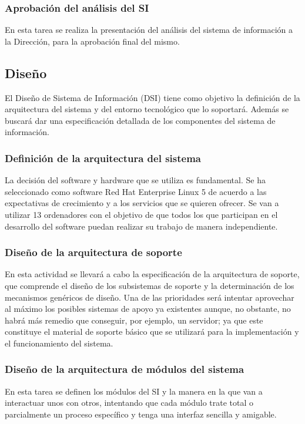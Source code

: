 \documentclass[11pt,a4paper,spanish,twoside]{book}
\begin{document}
\subsubsection{Aprobación del análisis del SI}
En esta tarea se realiza la presentación del análisis del sistema de
información a la Dirección, para la aprobación final del mismo.

\subsection{Diseño}
El Diseño de Sistema de Información (DSI) tiene como objetivo la definición
de la arquitectura del sistema y del entorno tecnológico que lo soportará. 
Además se buscará dar una especificación detallada de los componentes del 
sistema de información.

\subsubsection{Definición de la arquitectura del sistema}
La decisión del software y hardware que se utiliza es fundamental. Se ha
seleccionado como software Red Hat Enterprise Linux 5 de acuerdo a las
expectativas de crecimiento y a los servicios que se quieren ofrecer. Se
van a utilizar 13 ordenadores con el objetivo de que todos los que participan
en el desarrollo del software puedan realizar su trabajo de manera 
independiente. 
 
\subsubsection{Diseño de la arquitectura de soporte}
En esta actividad se llevará a cabo la especificación de la arquitectura de 
soporte, que comprende el diseño de los subsistemas de soporte y la 
determinación de los mecanismos genéricos de diseño. Una de las prioridades 
será intentar aprovechar al máximo los posibles sistemas de apoyo ya existentes
aunque, no obstante, no habrá más remedio que conseguir, por ejemplo, un 
servidor; ya que este constituye el material de soporte básico que se utilizará
para la implementación y el funcionamiento del sistema.

\subsubsection{Diseño de la arquitectura de módulos del sistema}
En esta tarea se definen los módulos del SI y la manera en la que van a 
interactuar unos con otros, intentando que cada módulo trate total o 
parcialmente un proceso específico y tenga una interfaz sencilla y amigable.
\end{document}
